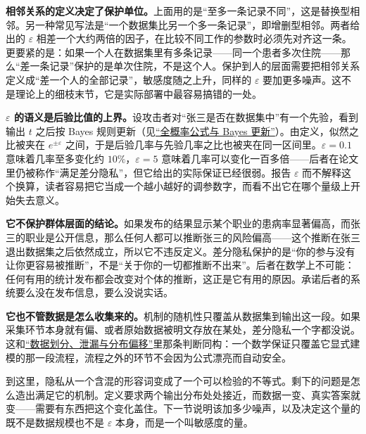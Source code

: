 \textbf{相邻关系的定义决定了保护单位。}上面用的是``至多一条记录不同''，这是替换型相邻。另一种常见写法是``一个数据集比另一个多一条记录''，即增删型相邻。两者给出的 \(\varepsilon\) 相差一个大约两倍的因子，在比较不同工作的参数时必须先对齐这一条。更要紧的是：如果一个人在数据集里有多条记录——同一个患者多次住院——那么``差一条记录''保护的是单次住院，不是这个人。保护到人的层面需要把相邻关系定义成``差一个人的全部记录''，敏感度随之上升，同样的 \(\varepsilon\) 要加更多噪声。这不是理论上的细枝末节，它是实际部署中最容易搞错的一处。

\textbf{\(\varepsilon\) 的语义是后验比值的上界。}设攻击者对``张三是否在数据集中''有一个先验，看到输出 \(t\) 之后按 Bayes 规则更新（见\hyperref[sec:05-Probability/02-Conditional-Probability/02]{``全概率公式与 Bayes 更新''}）。由定义，似然之比被夹在 \(e^{\pm\varepsilon}\) 之间，于是后验几率与先验几率之比也被夹在同一区间里。\(\varepsilon=0.1\) 意味着几率至多变化约 \(10\%\)，\(\varepsilon=5\) 意味着几率可以变化一百多倍——后者在论文里仍被称作``满足差分隐私''，但它给出的实际保证已经很弱。报告 \(\varepsilon\) 而不解释这个换算，读者容易把它当成一个越小越好的调参数字，而看不出它在哪个量级上开始失去意义。

\textbf{它不保护群体层面的结论。}如果发布的结果显示某个职业的患病率显著偏高，而张三的职业是公开信息，那么任何人都可以推断张三的风险偏高——这个推断在张三退出数据集之后依然成立，所以它不违反定义。差分隐私保护的是``你的参与没有让你更容易被推断''，不是``关于你的一切都推断不出来''。后者在数学上不可能：任何有用的统计发布都会改变对个体的推断，这正是它有用的原因。承诺后者的系统要么没在发布信息，要么没说实话。

\textbf{它也不管数据是怎么收集来的。}机制的随机性只覆盖从数据集到输出这一段。如果采集环节本身就有偏、或者原始数据被明文存放在某处，差分隐私一个字都没说。这和\hyperref[sec:13-Machine-Learning/01-Learning-Problems-and-Evaluation/04]{``数据划分、泄漏与分布偏移''}里那条判断同构：一个数学保证只覆盖它显式建模的那一段流程，流程之外的环节不会因为公式漂亮而自动安全。

到这里，隐私从一个含混的形容词变成了一个可以检验的不等式。剩下的问题是怎么造出满足它的机制。定义要求两个输出分布处处接近，而数据一变、真实答案就变——需要有东西把这个变化盖住。下一节说明该加多少噪声，以及决定这个量的既不是数据规模也不是 \(\varepsilon\) 本身，而是一个叫敏感度的量。
